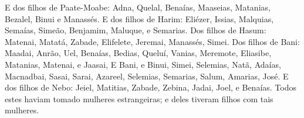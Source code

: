 {  E dos filhos de Paate-Moabe: Adna, Quelal, Benaías, Maaseias, Matanias, Bezalel, Binui e Manassés.
  E dos filhos de Harim: Eliézer, Issias, Malquias, Semaías, Simeão,
  Benjamim, Maluque, e Semarias.
  Dos filhos de Hasum: Matenai, Matatá, Zabade, Elifelete, Jeremai, Manassés, Simei.
  Dos filhos de Bani: Maadai, Anrão, Uel,
  Benaías, Bedias, Queluí,
  Vanias, Meremote, Eliasibe,
  Matanias, Matenai, e Jaasai,
  E Bani, e Binui, Simei,
  Selemias, Natã, Adaías,
  Macnadbai, Sasai, Sarai,
  Azareel, Selemias, Semarias,
  Salum, Amarias, José.
  E dos filhos de Nebo: Jeiel, Matitias, Zabade, Zebina, Jadai, Joel, e Benaías.
  Todos estes haviam tomado mulheres estrangeiras; e {} deles tiveram filhos com tais mulheres.
\par }

